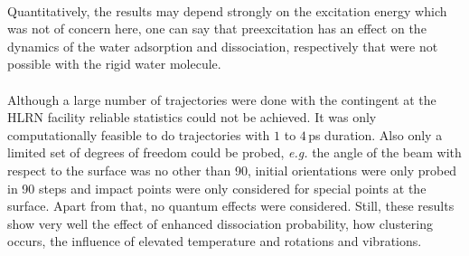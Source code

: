 \documentclass[11pt,DIV=13,BCOR=5mm,a4paper,headinclude]{scrbook}
\begin{document}
\\
Quantitatively, the results may depend strongly on the excitation energy which was not of concern here, one can say that preexcitation has an effect on the dynamics of the water adsorption and dissociation, respectively that were not possible with the rigid water molecule.
\\
\\
Although a large number of trajectories were done with the contingent at the HLRN facility reliable statistics could not be achieved.
It was only computationally feasible to do trajectories with $1$ to $4\,$ps duration.
Also only a limited set of degrees of freedom could be probed, \textit{e.g.} the angle of the beam with respect to the surface was no other than 90\textdegree{}, initial orientations were only probed in 90\textdegree{} steps and impact points were only considered for special points at the surface.
Apart from that, no quantum effects were considered.
Still, these results show very well the effect of enhanced dissociation probability, how clustering occurs, the influence of elevated temperature and rotations and vibrations\cite{Heiden0001_2018}.
\clearpage

\end{document}
